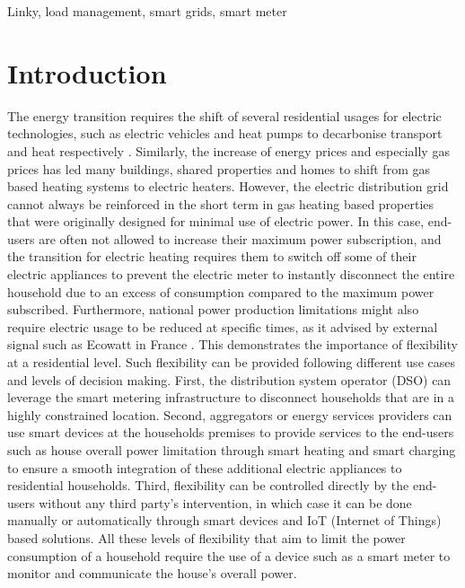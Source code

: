 \documentclass[conference]{IEEEtran}
\begin{document}
\begin{IEEEkeywords}
	Linky, load management, smart grids, smart meter
\end{IEEEkeywords}

\section{Introduction}
The energy transition requires the shift of several residential usages for electric technologies, such as electric vehicles and heat pumps to decarbonise transport and heat respectively \cite{RTEScenario:techrep}. Similarly, the increase of energy prices and especially gas prices has led many buildings, shared properties and homes to shift from gas based heating systems to electric heaters. However,   the electric distribution  grid cannot always be reinforced in the short term in gas heating based  properties that were originally designed for minimal use of electric power. In this case, end-users are often not allowed to increase their maximum power subscription, and the transition for electric heating requires them to switch off some of their electric appliances to prevent the electric meter to instantly disconnect the entire household due to an excess of consumption compared to the maximum power subscribed. Furthermore, national power production limitations might also require electric usage to be reduced at specific times, as it advised by external signal such as Ecowatt in France \cite{ecowatt:website}. This demonstrates the importance of flexibility at a residential level. Such flexibility can be provided following different use cases and levels of decision making. First, the distribution system operator (DSO) can leverage the smart metering infrastructure to disconnect  households that are in a highly constrained location. Second, aggregators or energy services providers can use smart devices at the households premises to provide services to the end-users such as house overall power limitation through smart heating \cite{voltalis:website} and smart charging \cite{chargeangels:website} to ensure a smooth integration of these additional electric appliances to residential households. Third, flexibility can be controlled directly by the end-users without any third party's intervention, in which case it can be done manually or automatically through smart devices and IoT (Internet of Things) based solutions. All these levels of flexibility that aim to limit the power consumption of a household require the use of a device such as a smart meter to monitor and communicate the house's overall power. 
\end{document}
